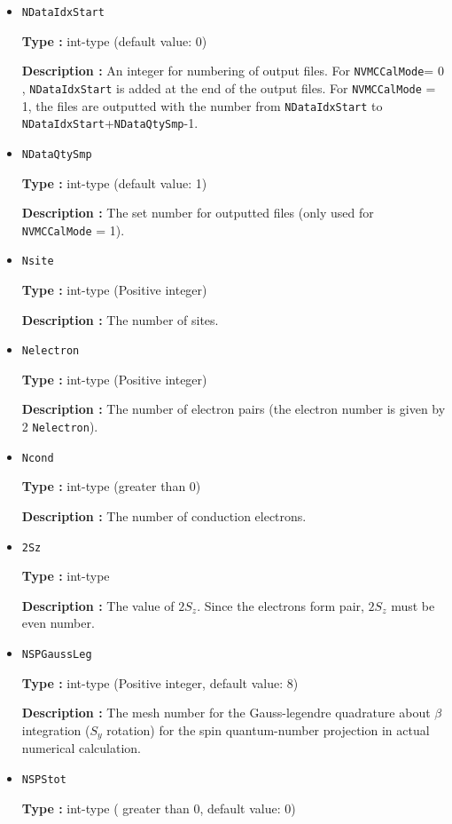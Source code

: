 \begin{itemize}
 \item  \verb|NDataIdxStart|

 {\bf Type :} int-type (default value: 0)

{\bf Description :} An integer for numbering of output files. For \verb|NVMCCalMode|= 0 , \verb|NDataIdxStart| is added at the end of the output files. For \verb|NVMCCalMode| = 1,  the files are outputted with the number from \verb|NDataIdxStart| to  \verb|NDataIdxStart|+\verb|NDataQtySmp|-1.
   
 \item  \verb|NDataQtySmp|

 {\bf Type :} int-type (default value: 1)

{\bf Description :} The set number for outputted files (only used for \verb|NVMCCalMode| = 1). 

 \item  \verb|Nsite|

{\bf Type :} int-type (Positive integer)

{\bf Description :} The number of sites.  

\item  \verb|Nelectron|

{\bf Type :} int-type (Positive integer)

{\bf Description :} The number of electron pairs (the electron number is given by 2 \verb|Nelectron|).

\item  \verb|Ncond|

{\bf Type :} int-type (greater than 0)

{\bf Description :} The number of conduction electrons.

\item  \verb|2Sz|

{\bf Type :} int-type 

{\bf Description :} The value of $2S_z$. Since the electrons form pair,  $2S_z$ must be even number.

 \item  \verb|NSPGaussLeg|

{\bf Type :} {int-type (Positive integer, default value: 8)}

{\bf Description :} The mesh number for the Gauss-legendre quadrature about $\beta$ integration ($S_y$ rotation) for the spin quantum-number projection in actual numerical calculation.

 \item  \verb|NSPStot|

{\bf Type :} int-type ( greater than 0,  default value: 0)


\end{itemize}
